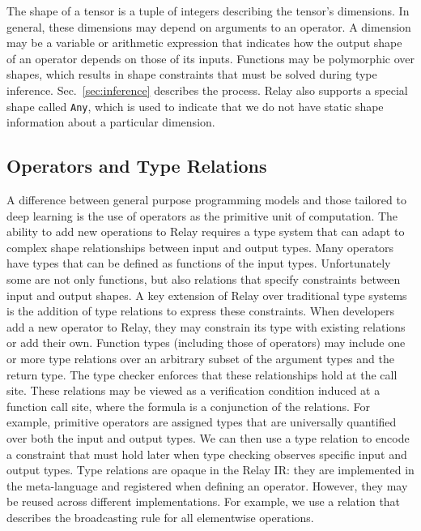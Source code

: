   The shape of a tensor is a tuple of integers describing the tensor's dimensions.
  In general, these dimensions may depend on arguments to an operator.
  A dimension may be a variable or arithmetic expression that indicates how the
    output shape of an operator depends on those of its inputs.
  Functions may be polymorphic over shapes, which results
    in shape constraints that must be solved during type inference.
  Sec.~\ref{sec:inference} describes the process.
  Relay also supports a special shape called \verb|Any|, which is used
    to indicate that we do not have static shape information about a particular dimension.

  \subsection{Operators and Type Relations}

  A difference between general purpose programming models and those tailored to deep learning
    is the use of operators as the primitive unit of computation.
  The ability to add new operations to Relay requires a type system that can adapt to
    complex shape relationships between input and output types.
  Many operators have types that can be defined
    as functions of the input types.
  Unfortunately some are not only functions,
    but also relations that specify constraints between input and output shapes.
  A key extension of Relay over traditional type systems is the addition of type relations
    to express these constraints.
  When developers add a new operator to Relay, they may constrain its
    type with existing relations or add their own.
  Function types (including those of operators) may include
    one or more type relations over an arbitrary subset of the argument types and the return type.
  The type checker enforces that these relationships hold at the call site.
  These relations may be viewed as a verification condition induced at a
    function call site, where the formula is a conjunction of the relations.
  For example, primitive operators are assigned types that are universally quantified over
    both the input and output types.
  We can then use a type relation to encode a constraint that must hold later
    when type checking observes specific input and output types.
  Type relations are opaque in the Relay IR: they are implemented in the
    meta-language and registered when defining an operator.
  However, they may be reused across different implementations.
  For example, we use a relation that describes the
    broadcasting rule for all elementwise operations.

